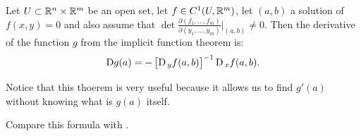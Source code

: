 \documentclass[11pt,a4paper]{article}
\begin{document}
\begin{theorem}
  Let $U \subset \mathbb{R}^n \times \mathbb{R}^m$ be an open set,
  let $f \in C^1(U,\mathbb{R}^m)$, 
  let $(a,b)$ a solution of $f(x,y) = 0$
  and also assume that $\det
  \frac{\partial(f_1,\dots,f_m)}{\partial(y_1,\dots,y_m)}\vert_{(a,b)} \neq 0$.
  Then the derivative of the function $g$ from the implicit function
  theorem is:
  \[
    \mathrm{D} g(a) = -\left[\mathrm{D}_{\,y} f(a,b)\right]^{-1} \mathrm{D}_{\,x} f(a,b).
  \]
\end{theorem}

\begin{remark}
  Notice that this thoerem is very useful because it allows us to find
  $g'(a)$ without knowing what is $g(a)$ itself.
\end{remark}

\begin{remark}
  Compare this formula with .
\end{remark}
\end{document}
